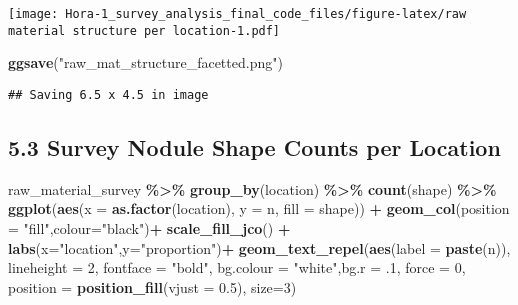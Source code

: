 \documentclass[
]{article}
\newenvironment{Shaded}{\begin{snugshade}}{\end{snugshade}}
\newcommand{\AttributeTok}[1]{\textcolor[rgb]{0.13,0.29,0.53}{#1}}
\newcommand{\DecValTok}[1]{\textcolor[rgb]{0.00,0.00,0.81}{#1}}
\newcommand{\FloatTok}[1]{\textcolor[rgb]{0.00,0.00,0.81}{#1}}
\newcommand{\FunctionTok}[1]{\textcolor[rgb]{0.13,0.29,0.53}{\textbf{#1}}}
\newcommand{\NormalTok}[1]{#1}
\newcommand{\SpecialCharTok}[1]{\textcolor[rgb]{0.81,0.36,0.00}{\textbf{#1}}}
\newcommand{\StringTok}[1]{\textcolor[rgb]{0.31,0.60,0.02}{#1}}
\begin{document}
\texttt{[image: Hora-1\_survey\_analysis\_final\_code\_files/figure-latex/raw material structure per location-1.pdf]}

\begin{Shaded}
\begin{Highlighting}[]
\FunctionTok{ggsave}\NormalTok{(}\StringTok{"raw\_mat\_structure\_facetted.png"}\NormalTok{)}
\end{Highlighting}
\end{Shaded}

\begin{verbatim}
## Saving 6.5 x 4.5 in image
\end{verbatim}

\hypertarget{survey-nodule-shape-counts-per-location}{%
\subsection{5.3 Survey Nodule Shape Counts per
Location}\label{survey-nodule-shape-counts-per-location}}

\begin{Shaded}
\begin{Highlighting}[]
\NormalTok{raw\_material\_survey }\SpecialCharTok{\%\textgreater{}\%}
  \FunctionTok{group\_by}\NormalTok{(location) }\SpecialCharTok{\%\textgreater{}\%}
  \FunctionTok{count}\NormalTok{(shape) }\SpecialCharTok{\%\textgreater{}\%}
  \FunctionTok{ggplot}\NormalTok{(}\FunctionTok{aes}\NormalTok{(}\AttributeTok{x =} \FunctionTok{as.factor}\NormalTok{(location), }\AttributeTok{y =}\NormalTok{ n, }\AttributeTok{fill =}\NormalTok{ shape)) }\SpecialCharTok{+}
  \FunctionTok{geom\_col}\NormalTok{(}\AttributeTok{position =} \StringTok{"fill"}\NormalTok{,}\AttributeTok{colour=}\StringTok{"black"}\NormalTok{)}\SpecialCharTok{+}
  \FunctionTok{scale\_fill\_jco}\NormalTok{() }\SpecialCharTok{+}
  \FunctionTok{labs}\NormalTok{(}\AttributeTok{x=}\StringTok{"location"}\NormalTok{,}\AttributeTok{y=}\StringTok{"proportion"}\NormalTok{)}\SpecialCharTok{+}
  \FunctionTok{geom\_text\_repel}\NormalTok{(}\FunctionTok{aes}\NormalTok{(}\AttributeTok{label =} \FunctionTok{paste}\NormalTok{(n)), }
                \AttributeTok{lineheight =} \DecValTok{2}\NormalTok{,}
            \AttributeTok{fontface =} \StringTok{"bold"}\NormalTok{, }\AttributeTok{bg.colour =} \StringTok{"white"}\NormalTok{,}\AttributeTok{bg.r =}\NormalTok{ .}\DecValTok{1}\NormalTok{, }\AttributeTok{force =} \DecValTok{0}\NormalTok{,}
                \AttributeTok{position =} \FunctionTok{position\_fill}\NormalTok{(}\AttributeTok{vjust =} \FloatTok{0.5}\NormalTok{), }\AttributeTok{size=}\DecValTok{3}\NormalTok{)}
\end{Highlighting}
\end{Shaded}
\end{document}
